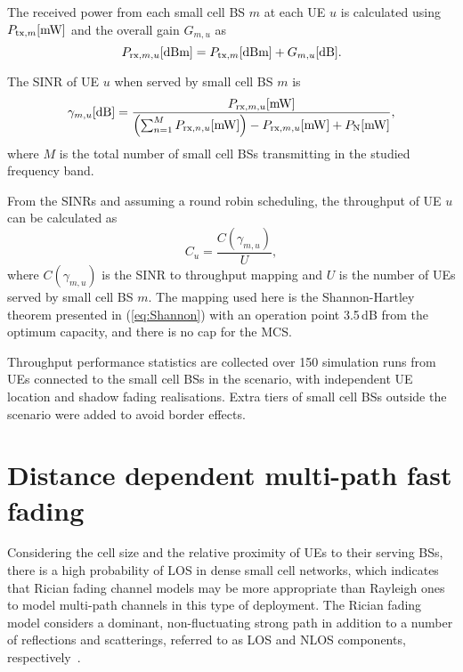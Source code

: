 \documentclass{IEEEtran}
\begin{document}
The received power from each small cell \ac{BS} $m$ at each \ac{UE} $u$ is calculated using $P_{\mathrm{tx},m}  {\rm [mW]}$ and the overall gain $G_{m,u}$ as
\begin{equation}
\label{received_power}
P_{\mathrm{rx},m,u}  {\rm [dBm]} = P_{\mathrm{tx},m}  {\rm [dBm]} + G_{m,u}  {\rm [dB]}.
\end{equation}

The \ac{SINR} of \ac{UE} $u$ when served by small cell \ac{BS} $m$ is
\begin{equation}
\label{SINR}
\small
\gamma_{m,u}  {\rm [dB]} = \frac{P_{\mathrm{rx},m,u}  {\rm [mW]}}{\left( \sum_{n=1}^{M} P_{\mathrm{rx},n,u}  {\rm [mW]} \right) - P_{\mathrm{rx},m,u}  {\rm [mW]} + P_\mathrm{N}  {\rm [mW]}}, \end{equation}
\normalsize
where $M$ is the total number of small cell \acp{BS} transmitting in the studied frequency band.


From the SINRs and assuming a round robin scheduling,
the throughput of \ac{UE} $u$ can be calculated as
\begin{equation}
\label{throughput}
C_u = \frac{C(\gamma_{m,u})}{U},
\end{equation}
where $C(\gamma_{m,u})$ is the SINR to throughput mapping and $U$ is the number of \acp{UE} served by small cell \ac{BS} $m$.
The mapping used here is the Shannon-Hartley theorem presented in (\ref{eq:Shannon}) with an operation point 3.5\,dB from the optimum capacity,
and there is no cap for the \ac{MCS}.


Throughput performance statistics are collected over 150 simulation runs from \acp{UE} connected to the small cell \acp{BS} in the scenario,
with independent \ac{UE} location and shadow fading realisations.
Extra tiers of small cell BSs outside the scenario were added to avoid border effects.

\section{Distance dependent multi-path fast fading}
\label{sec:appendix2}

Considering the cell size and the relative proximity of \acp{UE} to their serving \acp{BS},
there is a high probability of \ac{LOS} in dense small cell networks,
which indicates that Rician fading channel models may be more appropriate than Rayleigh ones to model multi-path channels in this type of deployment.
The Rician fading model considers a dominant, non-fluctuating strong path in addition to a number of reflections and scatterings,
referred to as \ac{LOS} and \ac{NLOS} components, respectively~\cite{HetNetbook}.
\end{document}
